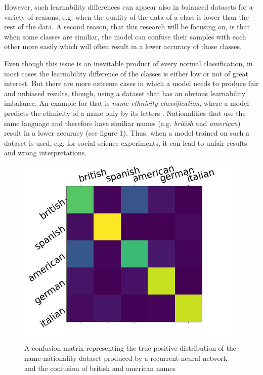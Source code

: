 \documentclass[journal]{IEEEtran}
\begin{document}
However, such learnability differences can appear also in balanced datasets for a variety of reasons, e.g. when the quality of the data of a class is lower than the rest of the data.
A second reason, that this research will be focusing on, is that when some classes are similiar,
the model can confuse their samples with each other more easily which will often result in a lower accuracy of those classes.

Even though this issue is an inevitable product of every normal classification, in most cases the learnability difference of the classes is either low or not of great interest.
But there are more extreme cases in which a model needs to produce fair and unbiased results, though, using a dataset that has an obvious learnability imbalance. 
An example for that is \emph{name-ethnicity classification}, where a model predicts the ethnicity of a name only by its letters \cite{mateos2007review}. 
Nationalities that use the same language and therefore have similiar names (e.g. \emph{british} and \emph{american}) result in a lower accuracy (see figure 1).
Thus, when a model trained on such a dataset is used, e.g. for social science experiments, it can lead to unfair results and wrong interpretations. 

\begin{figure}[h!]
        \includegraphics[width=\linewidth]{images/Figure_1.png}
        \caption{A confusion matrix representing the true positive distribution of the name-nationality dataset produced by a recurrent neural network and the confusion of british and american names}
        \label{fig:tp_scores}
\end{figure}
\end{document}
